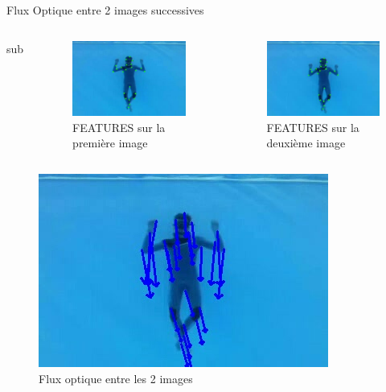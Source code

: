 \documentclass{bredelebeamer}
\begin{document}
\begin{frame}{Flux Optique entre 2 images successives}

\begin{columns}
sub
\begin{column}{0.3\textwidth}
\begin{figure}
\centering
\includegraphics[scale=0.3]{images/plongeurInitFeatures.jpeg}
\caption{FEATURES sur la première image}
\end{figure}
\end{column}


\begin{column}{0.3\textwidth}
\begin{figure}
\centering
\includegraphics[scale=0.3]{images/plongeurNextFeatures.jpeg}
\caption{FEATURES sur la deuxième image}
\end{figure}
\end{column}

\end{columns}

\begin{figure}
\centering
\includegraphics[scale=0.3]{images/plongeurOpticalFlow.jpeg}
\caption{Flux optique entre les 2 images}
\end{figure}


\end{frame}
\end{document}
